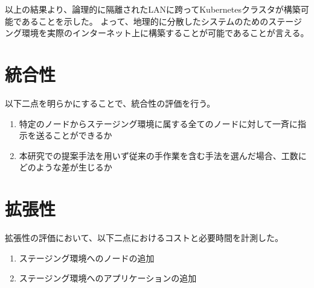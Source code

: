 以上の結果より、論理的に隔離されたLANに跨ってKubernetesクラスタが構築可能であることを示した。
よって、地理的に分散したシステムのためのステージング環境を実際のインターネット上に構築することが可能であることが言える。

\section{統合性}
\label{evaluation:method}

以下二点を明らかにすることで、統合性の評価を行う。

\begin{enumerate}
  \item 特定のノードからステージング環境に属する全てのノードに対して一斉に指示を送ることができるか
  \item 本研究での提案手法を用いず従来の手作業を含む手法を選んだ場合、工数にどのような差が生じるか
\end{enumerate}

\section{拡張性}
\label{evaluation:method}

拡張性の評価において、以下二点におけるコストと必要時間を計測した。

\begin{enumerate}
  \item ステージング環境へのノードの追加
  \item ステージング環境へのアプリケーションの追加
\end{enumerate}

